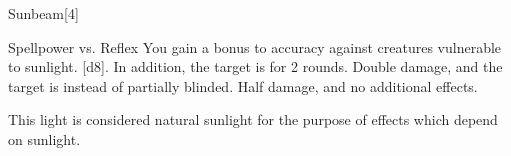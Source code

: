 \begin{spellsection}{Sunbeam}[4]
    \begin{spellheader}
    \end{spellheader}
    \begin{spellcontent}
        \begin{spelltargetinginfo}
        \end{spelltargetinginfo}
        \begin{spelleffects}
            \begin{spellattack}{Spellpower vs. Reflex}
                \spellspecial You gain a  bonus to accuracy against creatures vulnerable to sunlight.
                \spellsuccess {}[d8]. In addition, the target is \partiallyblinded for 2 rounds.
                \spellcritical Double damage, and the target is \blinded instead of partially blinded.
                \spellfailure Half damage, and no additional effects.
            \end{spellattack}
        \end{spelleffects}
    \end{spellcontent}
    \begin{spellfooter}
        \spellnotes This light is considered natural sunlight for the purpose of effects which depend on sunlight.
        \miscastexplode
    \end{spellfooter}
    \begin{spellaugments}
    \end{spellaugments}
\end{spellsection}

